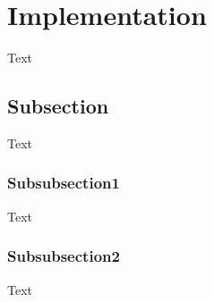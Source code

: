 \section{Implementation}
Text

\subsection{Subsection}
Text
\subsubsection{Subsubsection1}
Text
\subsubsection{Subsubsection2}
Text
